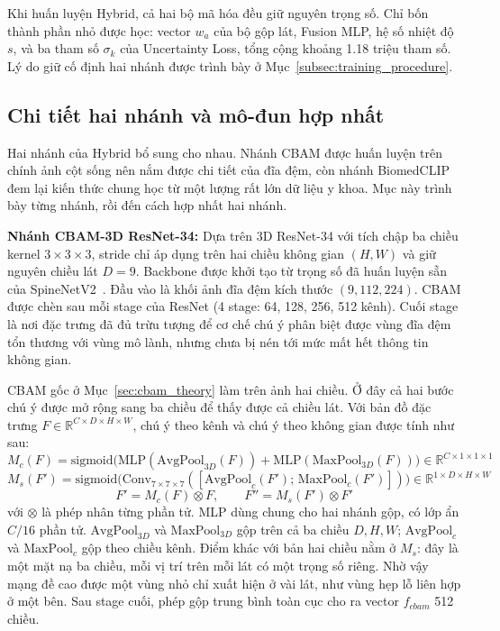 Khi huấn luyện Hybrid, cả hai bộ mã hóa đều giữ nguyên trọng số. Chỉ bốn thành phần nhỏ được học: vector $w_a$ của bộ gộp lát, Fusion MLP, hệ số nhiệt độ $s$, và ba tham số $\sigma_k$ của Uncertainty Loss, tổng cộng khoảng 1.18 triệu tham số. Lý do giữ cố định hai nhánh được trình bày ở Mục~\ref{subsec:training_procedure}.

\subsection{Chi tiết hai nhánh và mô-đun hợp nhất}
\label{subsec:branch_detail}

Hai nhánh của Hybrid bổ sung cho nhau. Nhánh CBAM được huấn luyện trên chính ảnh cột sống nên nắm được chi tiết của đĩa đệm, còn nhánh BiomedCLIP đem lại kiến thức chung học từ một lượng rất lớn dữ liệu y khoa. Mục này trình bày từng nhánh, rồi đến cách hợp nhất hai nhánh.

\textbf{Nhánh CBAM-3D ResNet-34:} Dựa trên 3D ResNet-34 với tích chập ba chiều kernel $3 \times 3 \times 3$, stride chỉ áp dụng trên hai chiều không gian $(H, W)$ và giữ nguyên chiều lát $D = 9$. Backbone được khởi tạo từ trọng số đã huấn luyện sẵn của SpineNetV2~\cite{windsor2022spinenetv2}. Đầu vào là khối ảnh đĩa đệm kích thước $(9, 112, 224)$. CBAM được chèn sau mỗi stage của ResNet (4 stage: 64, 128, 256, 512 kênh). Cuối stage là nơi đặc trưng đã đủ trừu tượng để cơ chế chú ý phân biệt được vùng đĩa đệm tổn thương với vùng mô lành, nhưng chưa bị nén tới mức mất hết thông tin không gian.

CBAM gốc ở Mục~\ref{sec:cbam_theory} làm trên ảnh hai chiều. Ở đây cả hai bước chú ý được mở rộng sang ba chiều để thấy được cả chiều lát. Với bản đồ đặc trưng $F \in \mathbb{R}^{C \times D \times H \times W}$, chú ý theo kênh và chú ý theo không gian được tính như sau:
\begin{equation}
    M_c(F) = \text{sigmoid}\big(\text{MLP}(\text{AvgPool}_{3D}(F)) + \text{MLP}(\text{MaxPool}_{3D}(F))\big) \in \mathbb{R}^{C \times 1 \times 1 \times 1}
    \label{eq:cbam3d_c}
\end{equation}
\begin{equation}
    M_s(F') = \text{sigmoid}\big(\text{Conv}_{7\times7\times7}([\text{AvgPool}_c(F');\, \text{MaxPool}_c(F')])\big) \in \mathbb{R}^{1 \times D \times H \times W}
    \label{eq:cbam3d_s}
\end{equation}
\begin{equation}
    F' = M_c(F) \otimes F, \qquad F'' = M_s(F') \otimes F'
    \label{eq:cbam3d_apply}
\end{equation}
với $\otimes$ là phép nhân từng phần tử. MLP dùng chung cho hai nhánh gộp, có lớp ẩn $C/16$ phần tử. $\text{AvgPool}_{3D}$ và $\text{MaxPool}_{3D}$ gộp trên cả ba chiều $D, H, W$; $\text{AvgPool}_c$ và $\text{MaxPool}_c$ gộp theo chiều kênh. Điểm khác với bản hai chiều nằm ở $M_s$: đây là một mặt nạ ba chiều, mỗi vị trí trên mỗi lát có một trọng số riêng. Nhờ vậy mạng đề cao được một vùng nhỏ chỉ xuất hiện ở vài lát, như vùng hẹp lỗ liên hợp ở một bên. Sau stage cuối, phép gộp trung bình toàn cục cho ra vector $f_{cbam}$ 512 chiều.

